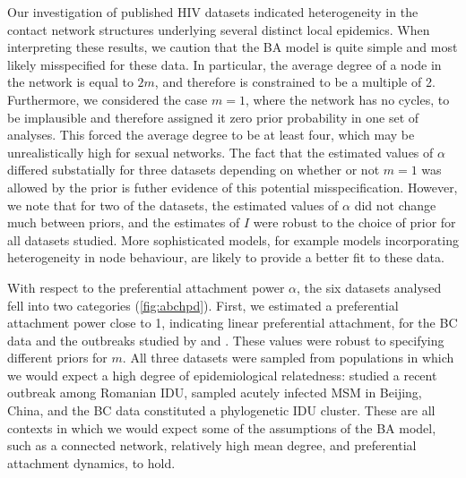 Our investigation of published HIV datasets indicated heterogeneity in the
contact network structures underlying several distinct local epidemics. When
interpreting these results, we caution that the BA model is quite simple and
most likely misspecified for these data. In particular, the average degree of a
node in the network is equal to $2m$, and therefore is constrained to be a
multiple of 2. Furthermore, we considered the case $m = 1$, where the network
has no cycles, to be implausible and therefore assigned it zero prior
probability in one set of analyses. This forced the average degree to be at
least four, which may be unrealistically high for sexual networks. The fact
that the estimated values of $\alpha$ differed substatially for three datasets
depending on whether or not $m = 1$ was allowed by the prior is futher evidence
of this potential misspecification. However, we note that for two of the
datasets, the estimated values of $\alpha$ did not change much between priors,
and the estimates of $I$ were robust to the choice of prior for all datasets
studied. More sophisticated models, for example models incorporating
heterogeneity in node behaviour, are likely to provide a better fit to these
data.

With respect to the preferential attachment power $\alpha$, the six datasets
analysed fell into two categories (\cref{fig:abchpd}). First, we estimated a
preferential attachment power close to 1, indicating linear preferential
attachment, for the BC data and the outbreaks studied by
\textcite{niculescu2015recent} and \textcite{wang2015targeting}. These values
were robust to specifying different priors for $m$. All three datasets were
sampled from populations in which we would expect a high degree of
epidemiological relatedness: \textcite{niculescu2015recent} studied a recent
outbreak among Romanian \gls{IDU}, \citeauthor{wang2015targeting} sampled
acutely infected MSM in Beijing, China, and the BC data constituted a
phylogenetic \gls{IDU} cluster. These are all contexts in which we would expect
some of the assumptions of the BA model, such as a connected network,
relatively high mean degree, and preferential attachment dynamics, to hold.

